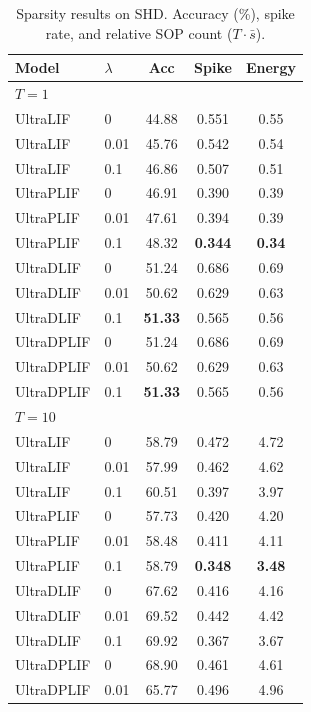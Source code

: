 \documentclass{article}
\theoremstyle{plain}
\theoremstyle{definition}
\theoremstyle{remark}
\begin{document}
\begin{table}[h]
\caption{Sparsity results on SHD. Accuracy (\%), spike rate, and relative SOP count ($T \cdot \bar{s}$).}
\label{tab:sparsity_shd}
\vskip 0.1in
\begin{center}
\begin{small}
\begin{tabular}{llccc}
\toprule
Model & $\lambda$ & Acc & Spike & Energy \\
\midrule
\multicolumn{5}{l}{\textit{$T{=}1$}} \\
UltraLIF   & 0    & 44.88 & 0.551 & 0.55 \\
UltraLIF   & 0.01 & 45.76 & 0.542 & 0.54 \\
UltraLIF   & 0.1  & 46.86 & 0.507 & 0.51 \\
UltraPLIF  & 0    & 46.91 & 0.390 & 0.39 \\
UltraPLIF  & 0.01 & 47.61 & 0.394 & 0.39 \\
UltraPLIF  & 0.1  & 48.32 & \textbf{0.344} & \textbf{0.34} \\
UltraDLIF  & 0    & 51.24 & 0.686 & 0.69 \\
UltraDLIF  & 0.01 & 50.62 & 0.629 & 0.63 \\
UltraDLIF  & 0.1  & \textbf{51.33} & 0.565 & 0.56 \\
UltraDPLIF & 0    & 51.24 & 0.686 & 0.69 \\
UltraDPLIF & 0.01 & 50.62 & 0.629 & 0.63 \\
UltraDPLIF & 0.1  & \textbf{51.33} & 0.565 & 0.56 \\
\midrule
\multicolumn{5}{l}{\textit{$T{=}10$}} \\
UltraLIF   & 0    & 58.79 & 0.472 & 4.72 \\
UltraLIF   & 0.01 & 57.99 & 0.462 & 4.62 \\
UltraLIF   & 0.1  & 60.51 & 0.397 & 3.97 \\
UltraPLIF  & 0    & 57.73 & 0.420 & 4.20 \\
UltraPLIF  & 0.01 & 58.48 & 0.411 & 4.11 \\
UltraPLIF  & 0.1  & 58.79 & \textbf{0.348} & \textbf{3.48} \\
UltraDLIF  & 0    & 67.62 & 0.416 & 4.16 \\
UltraDLIF  & 0.01 & 69.52 & 0.442 & 4.42 \\
UltraDLIF  & 0.1  & 69.92 & 0.367 & 3.67 \\
UltraDPLIF & 0    & 68.90 & 0.461 & 4.61 \\
UltraDPLIF & 0.01 & 65.77 & 0.496 & 4.96 \\

\end{tabular}
\end{small}
\end{center}
\end{table}
\end{document}
